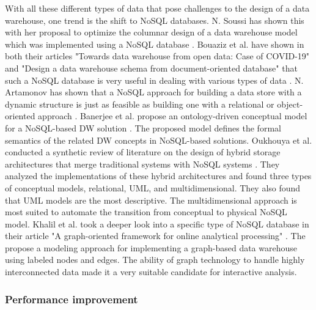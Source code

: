 \documentclass[11pt]{article}
\begin{document}
With all these different types of data that pose challenges to the design of a data warehouse, one trend is the shift to NoSQL databases. N. Soussi has shown this with her proposal to optimize the columnar design of a data warehouse model which was implemented using a NoSQL database \cite{Soussi2023762}. Bouaziz et al. have shown in both their articles "Towards data warehouse from open data: Case of COVID-19" and "Design a data warehouse schema from document-oriented database" that such a NoSQL database is very useful in dealing with various types of data \cite{Bouaziz2019221, Bouaziz2021129}. N. Artamonov has shown that a NoSQL approach for building a data store with a dynamic structure is just as feasible as building one with a relational or object-oriented approach \cite{Artamonov2019794}. Banerjee et al. propose an ontology-driven conceptual model for a NoSQL-based DW solution \cite{Banerjee2021162}. The proposed model defines the formal semantics of the related DW concepts in NoSQL-based solutions. Oukhouya et al. conducted a synthetic review of literature on the design of hybrid storage architectures that merge traditional systems with NoSQL systems \cite{Oukhouya2023332}. They analyzed the implementations of these hybrid architectures and found three types of conceptual models, relational, UML, and multidimensional. They also found that UML models are the most descriptive. The multidimensional approach is most suited to automate the transition from conceptual to physical NoSQL model. Khalil et al. took a deeper look into a specific type of NoSQL database in their article "A graph-oriented framework for online analytical processing" \cite{Khalil2022547}. The propose a modeling approach for implementing a graph-based data warehouse using labeled nodes and edges. The ability of graph technology to handle highly interconnected data made it a very suitable candidate for interactive analysis. \\

\subsubsection{Performance improvement}
\end{document}
